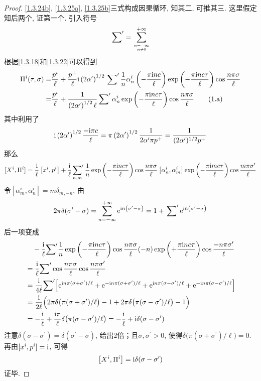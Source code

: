 \begin{proof}
    \eqref{1.3.24b}, \eqref{1.3.25a}, \eqref{1.3.25b}三式构成因果循环, 知其二, 可推其三. 这里假定知后两个, 证第一个. 引入符号
\[\sideset{}{'}\sum={\sum_{n=-\infty\atop n \neq 0}^{+\infty} }\]
根据\eqref{1.3.18}和\eqref{1.3.22}可以得到
\begin{align}
\Pi^{i}(\tau, \sigma)
=&\frac{p^{i}}{\ell}+\frac{p^+}{\ell}\mathrm{i} \left(2 \alpha^{\prime}\right)^{1 / 2} \sideset{}{'}\sum \frac{1}{n} \alpha_{n}^{i}\left(-\frac{\pi \mathrm{i} n c}{\ell}\right) \exp \left(-\frac{\pi \mathrm{i} n c \tau}{\ell}\right) \cos \frac{n \pi \sigma}{\ell} \nonumber \\
=&\frac{p^ i}{\ell}+\frac{1}{\left(2 \alpha^{\prime}\right)^{1 / 2} \ell} \sideset{}{'}\sum \alpha_{n}^{i} \exp \left(-\frac{\pi \mathrm{i} n c\tau}{\ell}\right) \cos \frac{n \pi \sigma}{\ell} \tag{1.a} \label{1.a}
\end{align}
其中利用了
\[
\mathrm{i}\left(2 \alpha^{\prime }\right)^{1 / 2} \frac{-\mathrm{i} \pi c}{\ell}=\pi\left(2 \alpha^{\prime}\right)^{1 / 2} \frac{1}{2 \alpha^{\prime} \pi p^{+}}=\frac{1}{(2 \alpha^\prime)^{1 / 2} p^{+}}
\]
那么
\[
[X^{i} , \Pi^{i}]=\frac{1}{\ell}\left[x^{i} , p^{i}\right]+\frac{\mathrm{i}}{\ell } \sideset{}{'}\sum_{n,m} \frac{1}{n} \exp \left(-\frac{\pi \mathrm{i} n c \tau}{\ell}\right) \cos \frac{n \pi \sigma}{\ell}
\left[\alpha_{n}^{i}, \alpha_{m}^{i}\right] \exp \left(-\frac{\pi \mathrm{i} m c \tau}{\ell}\right) \cos \frac{m \pi\sigma^\prime}{\ell}
\]
令$\left[\alpha_{m}^{i}, \alpha_{n}^{i}\right]=m \delta_{m,-n}$, 由
\[
2\pi\delta(\sigma^{\prime}-\sigma)=\sum_{n=-\infty}^{+\infty} \mathrm{e}^{ \mathrm{i} n\left(\sigma^{\prime}-\sigma\right)}
=1+\sideset{}{'}\sum \mathrm{e}^{ \mathrm{i} n \left(\sigma^{\prime}-\sigma\right)}
\]
后一项变成
\begin{align*}
&\quad -\frac{\mathrm{i}}{\ell} {\sum}^\prime \frac{1}{n} \exp \left(-\frac{\pi \mathrm{i} n c \tau}{\ell}\right) \cos \frac{n \pi \sigma}{\ell}(-n)  \exp \left(+\frac{\pi \mathrm{i} n c \tau}{\ell}\right) \cos \frac{-n \pi \sigma^\prime}{\ell}\\
&=\frac{\mathrm{i}}{\ell} {\sum}^\prime \cos\frac{n \pi \sigma}{\ell} \cos \frac{n \pi \sigma^{\prime}}{\ell} \\
&=\frac{\mathrm{i}}{ 4\ell}  {\sum}^\prime \Bigl[\mathrm{e}^{\mathrm{i} n \pi(\sigma+\sigma^{\prime})/\ell}+\mathrm{e}^{-\mathrm{i} n \pi(\sigma+\sigma^{\prime})/\ell}+ \mathrm{e}^{\mathrm{i} n \pi(\sigma-\sigma^{\prime})/\ell}+\mathrm{e}^{-\mathrm{i} n \pi(\sigma-\sigma^{\prime})/\ell}\Bigr]\\
&=\frac{\mathrm{i}}{2\ell} \Bigl( 2\pi\delta\bigl(\pi(\sigma+\sigma^{\prime})/\ell\bigr)-1+2\pi\delta\bigl(\pi(\sigma-\sigma^{\prime})/\ell\bigr)-1 \Bigr) \\
&=-\frac{\mathrm{i}}{\ell}+\frac{\mathrm{i} \pi}{ \ell} \delta\bigl(\pi(\sigma-\sigma^{\prime})/\ell\bigr) 
=-\frac{\mathrm{i}}{\ell}+\mathrm{i} \delta(\sigma-\sigma^{\prime})
\end{align*}
注意$\delta(\sigma-\sigma^\prime)=\delta(\sigma^\prime-\sigma)$, 给出2倍；且$\sigma,\sigma^\prime>0$, 使得$\delta\bigl(\pi(\sigma+\sigma^{\prime})/\ell\bigr)=0$. 再由$[x^{i}, p^{i}]=\mathrm{i}$, 可得
$$\left[X^{i} , \Pi^{i}\right]=\mathrm{i} \delta(\sigma-\sigma^{\prime})$$ 
证毕. 
\end{proof}
